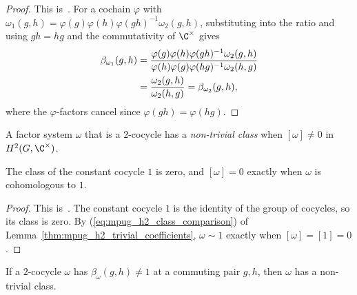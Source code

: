 \begin{proof}\leanok{}
    This is~\cite[``The commutator phase is a class
        invariant'']{QICLean2026Blueprint}.
    For a cochain $\varphi$ with
    $\omega_1(g,h)=\varphi(g)\varphi(h)\varphi(gh)^{-1}\omega_2(g,h)$,
    substituting into the ratio and using
    $gh=hg$ and the commutativity of $\C^{\times}$ gives
    \begin{align}
        \beta_{\omega_1}(g,h)
         & =
        \frac{\varphi(g)\varphi(h)\varphi(gh)^{-1} \omega_2(g,h)}
        {\varphi(h)\varphi(g)\varphi(hg)^{-1} \omega_2(h,g)}
        \notag                                  \\
         & =\frac{\omega_2(g,h)}{\omega_2(h,g)}
        =\beta_{\omega_2}(g,h),
        \label{eq:symmetry_comm_phase_invariance}
    \end{align}
    where the $\varphi$-factors cancel since
    $\varphi(gh)=\varphi(hg)$.
\end{proof}

\begin{definition}\label{def:nontrivial_class}
    \mathlibok %
    A factor system $\omega$ that is a $2$-cocycle has a \emph{non-trivial
        class} when $[\omega]\neq 0$ in $H^2(G,\C^{\times})$.
\end{definition}

\begin{lemma}\label{thm:trivial_class}
    \leanok
    The class of the constant cocycle $1$ is zero, and $[\omega]=0$ exactly
    when $\omega$ is cohomologous to $1$.
\end{lemma}

\begin{proof}\leanok
    This is~\cite[``The trivial class'']{QICLean2026Blueprint}.
    The constant cocycle $1$ is the identity of the group of cocycles, so its
    class is zero. By (\ref{eq:mpug_h2_class_comparison}) of
    Lemma~\ref{thm:mpug_h2_trivial_coefficients}, $\omega\sim1$ exactly
    when $[\omega]=[1]=0$.
\end{proof}

\begin{lemma}\label{thm:nontrivial_of_comm_phase}
    \leanok
    If a $2$-cocycle $\omega$ has $\beta_\omega(g,h)\neq 1$ at a commuting
    pair $g,h$, then $\omega$ has a non-trivial class.
\end{lemma}

